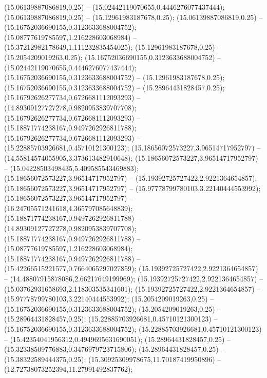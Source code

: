  (15.06139887086819,0.25) -- (15.02442119070655,0.4446276077437444);
 (15.06139887086819,0.25) -- (15.12961983187678,0.25);
 (15.06139887086819,0.25) -- (15.16752036690155,0.3123633688004752);
 (15.08777619785597,1.216228603068984) -- (15.37212982178649,1.111232835454025);
 (15.12961983187678,0.25) -- (15.2054209019263,0.25);
 (15.16752036690155,0.3123633688004752) -- (15.02442119070655,0.4446276077437444);
 (15.16752036690155,0.3123633688004752) -- (15.12961983187678,0.25);
 (15.16752036690155,0.3123633688004752) -- (15.28964431828457,0.25);
 (15.16792626277734,0.6726681112093293) -- (14.89309127727278,0.9820953839707708);
 (15.16792626277734,0.6726681112093293) -- (15.18871774238167,0.9497262926811788);
 (15.16792626277734,0.6726681112093293) -- (15.22885703926681,0.45710121300123);
 (15.18656072573227,3.96514717952797) -- (14.55814574055905,3.373613482910648);
 (15.18656072573227,3.96514717952797) -- (15.04228503498435,5.409585543469883);
 (15.18656072573227,3.96514717952797) -- (15.19392725727422,2.9221364654857);
 (15.18656072573227,3.96514717952797) -- (15.97778799780103,3.22140444553992);
 (15.18656072573227,3.96514717952797) -- (16.24705571241618,4.365797085648839);
 (15.18871774238167,0.9497262926811788) -- (14.89309127727278,0.9820953839707708);
 (15.18871774238167,0.9497262926811788) -- (15.08777619785597,1.216228603068984);
 (15.18871774238167,0.9497262926811788) -- (15.42266515221577,0.7664065297027859);
 (15.19392725727422,2.9221364654857) -- (14.48807915878086,2.66217649199969);
 (15.19392725727422,2.9221364654857) -- (15.03762931658693,2.118303535341601);
 (15.19392725727422,2.9221364654857) -- (15.97778799780103,3.22140444553992);
 (15.2054209019263,0.25) -- (15.16752036690155,0.3123633688004752);
 (15.2054209019263,0.25) -- (15.28964431828457,0.25);
 (15.22885703926681,0.45710121300123) -- (15.16752036690155,0.3123633688004752);
 (15.22885703926681,0.45710121300123) -- (15.42354041956312,0.4949695631690051);
 (15.28964431828457,0.25) -- (15.32338509776883,0.3476979723715806);
 (15.28964431828457,0.25) -- (15.38322589444375,0.25);
 (15.30925309978675,11.70187419950896) -- (12.72738073252394,11.27991492837762);
